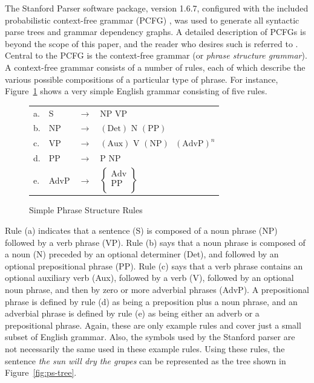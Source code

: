 \documentclass[main.tex]{subfiles}
\begin{document}
The Stanford Parser software package, version 1.6.7, configured with the included probabilistic context-free grammar (PCFG) \citep*{klein-manning-pcfg:2003}, was used to generate all syntactic parse trees and grammar dependency graphs. A detailed description of PCFGs is beyond the scope of this paper, and the reader who desires such is referred to \citet{booth:1973}. Central to the PCFG is the context-free grammar (or \textit{phrase structure grammar}). A context-free grammar consists of a number of rules, each of which describe the various possible compositions of a particular type of phrase. For instance, Figure~\ref{fig:ps-rules} shows a very simple English grammar consisting of five rules.
\begin{figure}
\centering
\begin{tabular}{l l l l}
a. & S & $\rightarrow$ & $\text{NP} \text{ VP}$\\ 
b. & NP & $\rightarrow$ & $(\text{Det}) \text{ N } (\text{PP})$\\
c. & VP & $\rightarrow$ & $(\text{Aux}) \text{ V } (\text{NP}) \text{ } (\text{AdvP})^n$\\
d. & PP & $\rightarrow$ & $\text{P } \text{NP}$\\
e. & AdvP &  $\rightarrow$ & $\begin{Bmatrix}
\text{Adv} \\ \text{PP} \\
\end{Bmatrix} $
\end{tabular}
\caption{Simple Phrase Structure Rules \citep[p. 195]{akmajian:2010}}
\label{fig:ps-rules}
\end{figure}
Rule (a) indicates that a sentence (S) is composed of a noun phrase (NP) followed by a verb phrase (VP). Rule (b) says that a noun phrase is composed of a noun (N) preceded by an optional determiner (Det), and followed by an optional prepositional phrase (PP). Rule (c) says that a verb phrase contains an optional auxiliary verb (Aux), followed by a verb (V), followed by an optional noun phrase, and then by zero or more adverbial phrases (AdvP). A prepositional phrase is defined by rule (d) as being a preposition plus a noun phrase, and an adverbial phrase is defined by rule (e) as being either an adverb or a prepositional phrase. Again, these are only example rules and cover just a small subset of English grammar. Also, the symbols used by the Stanford parser are not necessarily the same used in these example rules. Using these rules, the sentence \textit{the sun will dry the grapes} can be represented as the tree shown in Figure~\ref{fig:ps-tree}.
\end{document}
